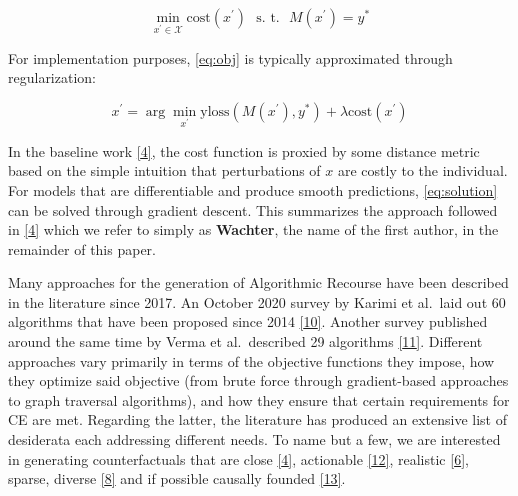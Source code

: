\documentclass[conference,final,]{IEEEtran}
\theoremstyle{definition}
\theoremstyle{definition}
\theoremstyle{definition}
\theoremstyle{definition}
\theoremstyle{remark}
\begin{document}
\begin{equation}
\min_{x^\prime \in \mathcal{X}} \text{cost}(x^\prime) \ \ \ \mbox{s. t.} \ \ \ M(x^\prime) = y^* \label{eq:obj}
\end{equation}

For implementation purposes, \eqref{eq:obj} is typically approximated through regularization:

\begin{equation}
x^\prime = \arg \min_{x^\prime}  \text{yloss}(M(x^\prime),y^*) + \lambda \text{cost}(x^\prime) \label{eq:solution}
\end{equation}

In the baseline work \protect\hyperlink{ref-wachter2017counterfactual}{{[}4{]}}, the cost function is proxied by some distance metric based on the simple intuition that perturbations of \(x\) are costly to the individual. For models that are differentiable and produce smooth predictions, \eqref{eq:solution} can be solved through gradient descent. This summarizes the approach followed in \protect\hyperlink{ref-wachter2017counterfactual}{{[}4{]}} which we refer to simply as \textbf{Wachter}, the name of the first author, in the remainder of this paper.

Many approaches for the generation of Algorithmic Recourse have been described in the literature since 2017. An October 2020 survey by Karimi et al.~laid out 60 algorithms that have been proposed since 2014 \protect\hyperlink{ref-karimi2020survey}{{[}10{]}}. Another survey published around the same time by Verma et al.~described 29 algorithms \protect\hyperlink{ref-verma2020counterfactual}{{[}11{]}}. Different approaches vary primarily in terms of the objective functions they impose, how they optimize said objective (from brute force through gradient-based approaches to graph traversal algorithms), and how they ensure that certain requirements for CE are met. Regarding the latter, the literature has produced an extensive list of desiderata each addressing different needs. To name but a few, we are interested in generating counterfactuals that are close \protect\hyperlink{ref-wachter2017counterfactual}{{[}4{]}}, actionable \protect\hyperlink{ref-ustun2019actionable}{{[}12{]}}, realistic \protect\hyperlink{ref-schut2021generating}{{[}6{]}}, sparse, diverse \protect\hyperlink{ref-mothilal2020explaining}{{[}8{]}} and if possible causally founded \protect\hyperlink{ref-karimi2021algorithmic}{{[}13{]}}.
\end{document}
